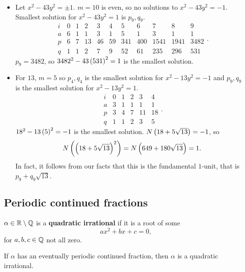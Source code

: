 \begin{example*}
\hfill
\begin{itemize}
\item Let $ x^2 - 43y^2 = \pm 1 $. $ m = 10 $ is even, so no solutions to $ x^2 - 43y^2 = -1 $. Smallest solution for $ x^2 - 43y^2 = 1 $ is $ p_9, q_9 $.
$$
\begin{array}{c|cccccccccc}
i & 0 & 1 & 2 & 3 & 4 & 5 & 6 & 7 & 8 & 9 \\
\hline
a & 6 & 1 & 1 & 3 & 1 & 5 & 1 & 3 & 1 & 1 \\
p & 6 & 7 & 13 & 46 & 59 & 341 & 400 & 1541 & 1941 & 3482 \\
q & 1 & 1 & 2 & 7 & 9 & 52 & 61 & 235 & 296 & 531
\end{array}.
$$
$ p_9 = 3482 $, so $ 3482^2 - 43\left( 531 \right)^2 = 1 $ is the smallest solution.
\item For $ 13 $, $ m = 5 $ so $ p_4, q_4 $ is the smallest solution for $ x^2 - 13y^2 = -1 $ and $ p_9, q_9 $ is the smallest solution for $ x^2 - 13y^2 = 1 $.
$$
\begin{array}{c|ccccc}
i & 0 & 1 & 2 & 3 & 4 \\
\hline
a & 3 & 1 & 1 & 1 & 1 \\
p & 3 & 4 & 7 & 11 & 18 \\
q & 1 & 1 & 2 & 3 & 5
\end{array}.
$$
$ 18^2 - 13\left( 5 \right)^2 = -1 $ is the smallest solution. $ N\left( 18 + 5\sqrt{13} \right) = -1 $, so
$$ N\left( \left( 18 + 5\sqrt{13} \right)^2 \right) = N\left( 649 + 180\sqrt{13} \right) = 1. $$
In fact, it follows from our facts that this is the fundamental $ 1 $-unit, that is $ p_9 + q_9\sqrt{13} $.
\end{itemize}
\end{example*}


\subsection{Periodic continued fractions}

\begin{definition}
$ \alpha \in \mathbb{R} \setminus \mathbb{Q} $ is a \textbf{quadratic irrational} if it is a root of some
$$ ax^2 + bx + c = 0, $$
for $ a, b, c \in \mathbb{Q} $ not all zero.
\end{definition}

\begin{proposition}
If $ \alpha $ has an eventually periodic continued fraction, then $ \alpha $ is a quadratic irrational.
\end{proposition}

